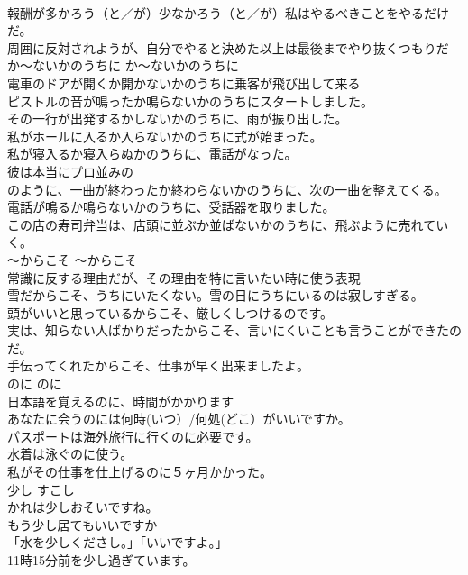 \documentclass[8pt]{extreport}
\begin{document}
\begin{CJK}{UTF8}{min}
\\	報酬が多かろう（と／が）少なかろう（と／が）私はやるべきことをやるだけだ。   
\\	周囲に反対されようが、自分でやると決めた以上は最後までやり抜くつもりだ  
\\	か〜ないかのうちに	か〜ないかのうちに	
\\	電車のドアが開くか開かないかのうちに乗客が飛び出して来る  
\\	ピストルの音が鳴ったか鳴らないかのうちにスタートしました。  
\\	その一行が出発するかしないかのうちに、雨が振り出した。  
\\	私がホールに入るか入らないかのうちに式が始まった。  
\\	私が寝入るか寝入らぬかのうちに、電話がなった。  
\\	彼は本当にプロ並みの
\\	のように、一曲が終わったか終わらないかのうちに、次の一曲を整えてくる。  
\\	電話が鳴るか鳴らないかのうちに、受話器を取りました。  
\\	この店の寿司弁当は、店頭に並ぶか並ばないかのうちに、飛ぶように売れていく。  
\\	〜からこそ	〜からこそ	
\\	常識に反する理由だが、その理由を特に言いたい時に使う表現	
\\	雪だからこそ、うちにいたくない。雪の日にうちにいるのは寂しすぎる。  
\\	頭がいいと思っているからこそ、厳しくしつけるのです。  
\\	実は、知らない人ばかりだったからこそ、言いにくいことも言うことができたのだ。  
\\	手伝ってくれたからこそ、仕事が早く出来ましたよ。  
\\	のに	のに	
\\	日本語を覚えるのに、時間がかかります  
\\	あなたに会うのには何時(いつ）/何処(どこ）がいいですか。  
\\	パスポートは海外旅行に行くのに必要です。   
\\	水着は泳ぐのに使う。  
\\	私がその仕事を仕上げるのに５ヶ月かかった。   
\\	少し	すこし	
\\	かれは少しおそいですね。
\\	もう少し居てもいいですか  
\\	「水を少しくださし。」「いいですよ。」  
\\	11時15分前を少し過ぎています。

\end{CJK}
\end{document}

